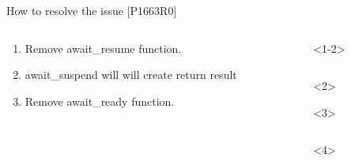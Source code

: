 \documentclass[10pt]{beamer}
\begin{document}
\begin{frame}{How to resolve the issue [P1663R0]}

\begin{columns}[T]
\begin{column}{0.3\linewidth}

\begin{enumerate}[<+-| alert@+>]
	\item Remove \alert{await\_resume} function.
	\item \alert{await\_suspend} will will create return result
	\item Remove \alert{await\_ready} function.
\end{enumerate}
\end{column}

\begin{column}{0.6\linewidth}
\begin{onlyenv}<1-2>
\inputminted{c++}{code-examples/RVO_examples/transformed_co_await.cpp}
\end{onlyenv}

\begin{onlyenv}<2>
\end{onlyenv}

\begin{onlyenv}<3>
\inputminted{c++}{code-examples/RVO_examples/transformed_co_await_no_ready.cpp}

\end{onlyenv}

\begin{onlyenv}<4>
\inputminted{c++}{code-examples/RVO_examples/transformed_co_await_simplified.cpp}
\end{onlyenv}
\end{column}

\end{columns}

\end{frame}
\end{document}
